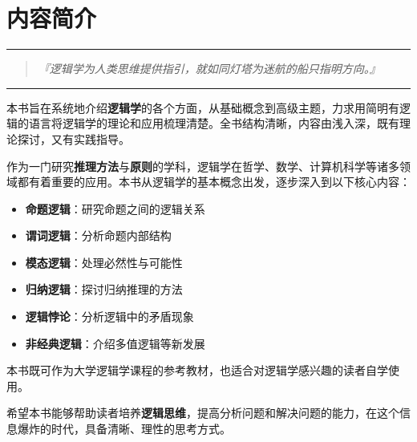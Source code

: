 \section*{内容简介}

\begin{center}
\rule{0.5\textwidth}{0.4pt}
\end{center}

\begin{quotation}
\large\textit{『逻辑学为人类思维提供指引，就如同灯塔为迷航的船只指明方向。』}
\end{quotation}

\begin{center}
\rule{0.5\textwidth}{0.4pt}
\end{center}

\vspace{1em}

本书旨在系统地介绍\textbf{逻辑学}的各个方面，从基础概念到高级主题，力求用简明有逻辑的语言将逻辑学的理论和应用梳理清楚。全书结构清晰，内容由浅入深，既有理论探讨，又有实践指导。

作为一门研究\textbf{推理方法}与\textbf{原则}的学科，逻辑学在哲学、数学、计算机科学等诸多领域都有着重要的应用。本书从逻辑学的基本概念出发，逐步深入到以下核心内容：

\begin{itemize}
  \item \textbf{命题逻辑}：研究命题之间的逻辑关系
  \item \textbf{谓词逻辑}：分析命题内部结构
  \item \textbf{模态逻辑}：处理必然性与可能性
  \item \textbf{归纳逻辑}：探讨归纳推理的方法
  \item \textbf{逻辑悖论}：分析逻辑中的矛盾现象
  \item \textbf{非经典逻辑}：介绍多值逻辑等新发展
\end{itemize}

本书既可作为大学逻辑学课程的参考教材，也适合对逻辑学感兴趣的读者自学使用。

\begin{center}
\end{center}

\vspace{1em}

希望本书能够帮助读者培养\textbf{逻辑思维}，提高分析问题和解决问题的能力，在这个信息爆炸的时代，具备清晰、理性的思考方式。